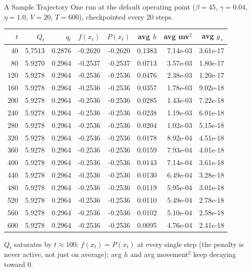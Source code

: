 \documentclass{beamer}
\begin{document}
\begin{frame}{A Sample Trajectory}
  \footnotesize
  One run at the default operating point ($\beta=45$, $\gamma=0.04$, $\eta=1.0$, $V=20$, $T=600$), checkpointed every 20 steps.

  \vspace{0.3em}
  \footnotesize
  \centering
  \begin{tabular}{r|rrrrrrr}
    $t$ & $Q_t$ & $q_t$ & $f(x_t)$ & $P(x_t)$ & avg $h$ & avg mv$^2$ & avg $g_+$ \\
    \hline
    40  & 5.7513 & 0.2876 & -0.2620 & -0.2620 & 0.1383 & 7.14e-03 & 3.61e-17 \\
    80  & 5.9270 & 0.2964 & -0.2537 & -0.2537 & 0.0713 & 3.57e-03 & 1.80e-17 \\
    120 & 5.9278 & 0.2964 & -0.2536 & -0.2536 & 0.0476 & 2.38e-03 & 1.20e-17 \\
    160 & 5.9278 & 0.2964 & -0.2536 & -0.2536 & 0.0357 & 1.78e-03 & 9.02e-18 \\
    200 & 5.9278 & 0.2964 & -0.2536 & -0.2536 & 0.0285 & 1.43e-03 & 7.22e-18 \\
    240 & 5.9278 & 0.2964 & -0.2536 & -0.2536 & 0.0238 & 1.19e-03 & 6.01e-18 \\
    280 & 5.9278 & 0.2964 & -0.2536 & -0.2536 & 0.0204 & 1.02e-03 & 5.15e-18 \\
    320 & 5.9278 & 0.2964 & -0.2536 & -0.2536 & 0.0178 & 8.92e-04 & 4.51e-18 \\
    360 & 5.9278 & 0.2964 & -0.2536 & -0.2536 & 0.0159 & 7.93e-04 & 4.01e-18 \\
    400 & 5.9278 & 0.2964 & -0.2536 & -0.2536 & 0.0143 & 7.14e-04 & 3.61e-18 \\
    440 & 5.9278 & 0.2964 & -0.2536 & -0.2536 & 0.0130 & 6.49e-04 & 3.28e-18 \\
    480 & 5.9278 & 0.2964 & -0.2536 & -0.2536 & 0.0119 & 5.95e-04 & 3.01e-18 \\
    520 & 5.9278 & 0.2964 & -0.2536 & -0.2536 & 0.0110 & 5.49e-04 & 2.78e-18 \\
    560 & 5.9278 & 0.2964 & -0.2536 & -0.2536 & 0.0102 & 5.10e-04 & 2.58e-18 \\
    600 & 5.9278 & 0.2964 & -0.2536 & -0.2536 & 0.0095 & 4.76e-04 & 2.41e-18 \\
  \end{tabular}

  \vspace{0.3em}
  \footnotesize
  \raggedright
  $Q_t$ saturates by $t\approx100$; $f(x_t)=P(x_t)$ at every single step (the penalty is never active, not just on average); avg $h$ and avg movement$^2$ keep decaying toward 0.
\end{frame}
\end{document}
